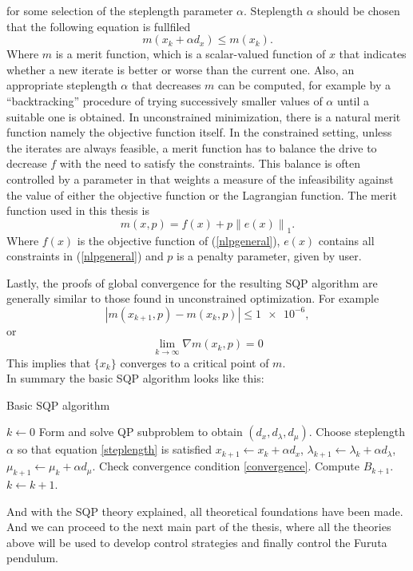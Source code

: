 for some selection of the steplength parameter $\alpha$. Steplength $\alpha$ should be chosen that the following equation is fullfiled
\begin{equation}\label{steplength}
	m(x_k + \alpha d_x)\leq m(x_k).
\end{equation}
Where $m$ is a merit function, which is a scalar-valued function of $x$ that indicates whether a new iterate is better or worse than the current one. Also, an appropriate steplength $\alpha$ that decreases $m$ can be computed, for example by a ``backtracking'' procedure of trying successively smaller values of $\alpha$ until a suitable one is obtained. In unconstrained minimization, there is a natural merit function namely the objective function itself. In the constrained setting, unless the iterates are always feasible, a merit function has to balance the drive to decrease $f$ with the need to satisfy the constraints. This balance is often controlled by a parameter in that weights a measure of the infeasibility against the value of either the objective function or the Lagrangian function. The merit function used in this thesis is
\begin{equation}
m(x,p) = f(x) + p\left\|e(x)\right\|_1.
\end{equation}
Where $f(x)$ is the objective function of (\ref{nlpgeneral}), $e(x)$ contains all constraints in (\ref{nlpgeneral}) and $p$ is a penalty parameter, given by user.

Lastly, the proofs of global convergence for the resulting SQP algorithm are generally similar to those found in unconstrained optimization. For example 
\begin{equation}\label{convergence}
	|m(x_{k+1},p) - m(x_{k},p)|\leq \num{1e-6},
\end{equation}
or
\begin{equation}
	\lim_{k\to\infty} \nabla m(x_{k},p) = 0
\end{equation}
This implies that $\{x_k\}$ converges to a critical point of $m$.\\

In summary the basic SQP algorithm looks like this:

\begin{algorithm}[H]
	\caption{Basic SQP algorithm}\label{SQP:algorithm}
	\begin{algorithmic}[1]
	\State $k\gets 0$
	\State Form and solve QP subproblem to obtain $(d_x,d_\lambda,d_\mu)$.
	\State Choose steplength $\alpha$ so that equation \ref{steplength} is satisfied
	\State 	$x_{k+1} \gets x_k + \alpha d_x$,
	\State $\lambda_{k+1} \gets \lambda_k + \alpha d_\lambda$,
	\State $\mu_{k+1} \gets \mu_k + \alpha d_\mu$.
	\State Check convergence condition \ref{convergence}.
	\State Compute $B_{k+1}$.
	\State $k \gets k+1$.	
	\EndWhile
	\EndProcedure	
	\end{algorithmic}
\end{algorithm}	
And with the SQP theory explained, all theoretical foundations have been made. And we can proceed to the next main part of the thesis, where all the theories above will be used to develop control strategies and finally control the Furuta pendulum.
